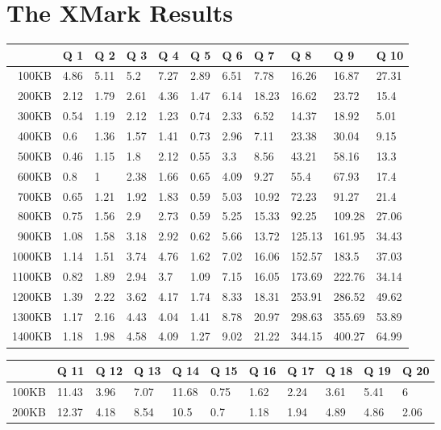 \chapter{The XMark Results}
\label{app:the-xmark-results}
\begin {table}[htpb]
\centering
\begin{tabular}{r|l|l|l|l|l|l|l|l|l|l}
&Q 1&Q 2&Q 3&Q 4&Q 5&Q 6&Q 7&Q 8&Q 9&Q 10\\
\hline
100KB&4.86&5.11&5.2&7.27&2.89&6.51&7.78&16.26&16.87&27.31\\
200KB&2.12&1.79&2.61&4.36&1.47&6.14&18.23&16.62&23.72&15.4\\
300KB&0.54&1.19&2.12&1.23&0.74&2.33&6.52&14.37&18.92&5.01\\
400KB&0.6&1.36&1.57&1.41&0.73&2.96&7.11&23.38&30.04&9.15\\
500KB&0.46&1.15&1.8&2.12&0.55&3.3&8.56&43.21&58.16&13.3\\
600KB&0.8&1&2.38&1.66&0.65&4.09&9.27&55.4&67.93&17.4\\
700KB&0.65&1.21&1.92&1.83&0.59&5.03&10.92&72.23&91.27&21.4\\
800KB&0.75&1.56&2.9&2.73&0.59&5.25&15.33&92.25&109.28&27.06\\
900KB&1.08&1.58&3.18&2.92&0.62&5.66&13.72&125.13&161.95&34.43\\
1000KB&1.14&1.51&3.74&4.76&1.62&7.02&16.06&152.57&183.5&37.03\\
1100KB&0.82&1.89&2.94&3.7&1.09&7.15&16.05&173.69&222.76&34.14\\
1200KB&1.39&2.22&3.62&4.17&1.74&8.33&18.31&253.91&286.52&49.62\\
1300KB&1.17&2.16&4.43&4.04&1.41&8.78&20.97&298.63&355.69&53.89\\
1400KB&1.18&1.98&4.58&4.09&1.27&9.02&21.22&344.15&400.27&64.99\\
\end{tabular}
\newline
\vspace*{0.5 cm}
\newline
\begin{tabular}{r|l|l|l|l|l|l|l|l|l|l}
&Q 11&Q 12&Q 13&Q 14&Q 15&Q 16&Q 17&Q 18&Q 19&Q 20\\
\hline
100KB&11.43&3.96&7.07&11.68&0.75&1.62&2.24&3.61&5.41&6\\
200KB&12.37&4.18&8.54&10.5&0.7&1.18&1.94&4.89&4.86&2.06\\

\end{tabular}
\end{table}
